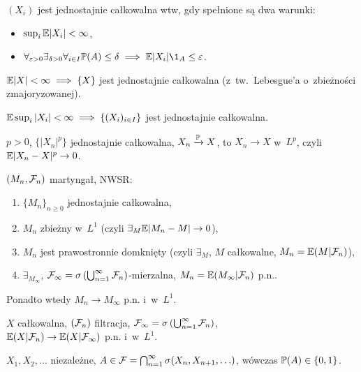 	\begin{fact}
		$(X_i)$ jest jednostajnie całkowalna wtw, gdy 
		spełnione są dwa warunki:
		\begin{itemize}
			\item $\sup_i \E |X_i| < \infty$,
			\item $\forall_{\varepsilon > 0}
			\exists_{\delta > 0}
			\forall_{i \in I}
			\P(A) \leq \delta \implies \E |X_i| \1_A \leq \varepsilon$.
		\end{itemize}

	\end{fact}
	
	\begin{example}
		$\E |X| < \infty \implies \{ X \}$ jest jednostajnie całkowalna
		(z~tw.~Lebesgue'a o~zbieżności zmajoryzowanej).
	\end{example}
	
	\begin{example}
		$\E \sup_i |X_i| < \infty \implies \{ (X_i)_{i \in I} \}$
		jest jednostajnie całkowalna.
	\end{example}
	
	\begin{theorem}
		$p>0$, $\{ |X_n|^p \}$ jednostajnie całkowalna,
		$X_n \xrightarrow \P X$, to $X_n \to X$ w~$L^p$,
		czyli $\E |X_n - X|^p \to 0$.
	\end{theorem}
	\begin{theorem}
		$(M_n, \F_n)$ martyngał, NWSR:
		\begin{enumerate}
			\item $\{ M_n \}_{n \geq 0}$ jednostajnie całkowalna,
			\item $M_n$ zbieżny w~$L^1$
			(czyli $\exists_M \E |M_n - M| \to 0$),
			\item $M_n$ jest prawostronnie domknięty
			(czyli $\exists_M$, $M$ całkowalne, 
			$M_n = \E(M | \F_n)$),
			\item $\exists_{M_\infty}$, 
			$\F_\infty=\sigma\left( \bigcup_{n=1}^\infty \F_n \right)
			$-mierzalna, 
			$M_n = \E (M_\infty | \F_n)$ p.n..
		\end{enumerate}
		Ponadto wtedy $M_n \to M_\infty$ p.n. i~w~$L^1$.
	\end{theorem}
	
	\begin{corollary}
		$X$ całkowalna, $(\F_n)$ filtracja, 
		$\F_\infty = \sigma\left( \bigcup_{n=1}^\infty \F_n \right)$,
		\\ ${\E( X|\F_n) \to \E(X|\F_\infty)}$ p.n. i~w~$L^1$.
	\end{corollary}
	
	\begin{corollary}
		$X_1, X_2, \ldots$ niezależne, 
		$A \in \F = \bigcap_{n=1}^\infty \sigma(X_n, X_{n+1}, \ldots)$,
		wówczas $\P(A) \in \{0,1\}$.
	\end{corollary}















 
 
